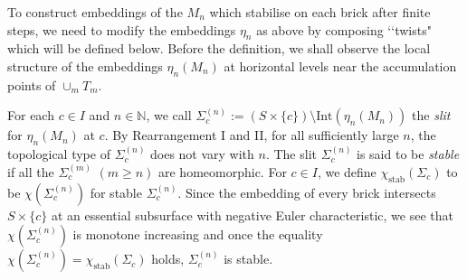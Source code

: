 \documentclass{amsart}
\theoremstyle{definition}
\numberwithin{figure}{section}
\numberwithin{equation}{section}
\newcommand{\blackboard}[1]{\ensuremath{\mathbb{#1}}}
\newcommand{\naturals}{\blackboard{N}}
\newcommand{\stab}{\mathrm{stab}}
\def\ck{\mathcal{K}}
\def\Int{\mathrm{Int}}
\def\Sg{\Sigma}
\def\Sg{\Sigma}
\begin{document}
\bigskip

To construct embeddings of the $M_n$ which stabilise on each brick after finite steps, we need to modify the embeddings $\eta_n$ as above by composing \lq\lq twists" which will be defined below.
Before the definition, we shall observe the local structure of the embeddings $\eta_n(M_n)$ at horizontal levels near the accumulation points of $\cup_m T_m$.

For each $c \in I$ and $n \in \naturals$, we call $\Sg_c^{(n)}:=(S\times \{c\})\setminus \Int (\eta_n(M_n))$  the \emph{slit} for $\eta_n(M_n)$ at $c$.
By Rearrangement I and II,  for all sufficiently large $n$, the topological type of  $\Sg_c^{(n)}$ does not vary with $n$.
The slit $\Sg_c^{(n)}$ is said to be \emph{stable} if all the $\Sg_c^{(m)}$ $(m\geq n)$ are homeomorphic.
For $c \in I$, we define $\chi_{\stab}(\Sg_c)$ to be $\chi(\Sg_c^{(n)})$ for stable $\Sg_c^{(n)}$.
Since the embedding of every brick intersects $S \times \{c\}$ at an essential subsurface with negative Euler characteristic, we see that $\chi(\Sg_c^{(n)})$ is monotone increasing and once the equality $\chi(\Sg_c^{(n)})=\chi_{\stab}(\Sg_c)$ holds, $\Sg_c^{(n)}$ is stable.
\end{document}
